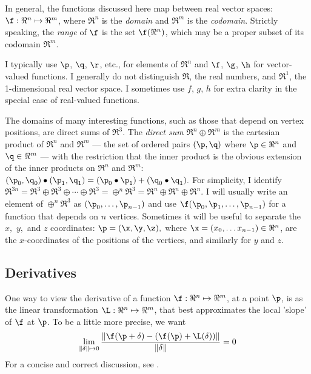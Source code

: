 In general, the functions discussed here map between real vector spaces:
$\f:{\Re}^{n} \mapsto \Re^{m}$, where $\Re^n$ is the
{\it domain} and $\Re^m$ is the {\it codomain}.
Strictly speaking, the {\it range} of $\f$ is the set $\f(\Re^n)$,
which may be a proper subset of its codomain $\Re^m$.

I typically use $\p$, $\q$, $\r$, etc., for elements of $\Re^n$
and
$\f$, $\g$, $\h$ for vector-valued functions.
I generally do not distinguish $\Re$, the real numbers,
and $\Re^1$, the 1-dimensional real vector space.
I sometimes use $f$, $g$, $h$ for extra clarity in the special
case of real-valued functions.

The domains of many interesting functions,
such as those that depend on vertex positions,
are direct sums of $\Re^3$.
The {\it direct sum} $\Re^n \oplus \Re^m$ is the cartesian product
of $\Re^n$ and $\Re^m$ --- the set of ordered pairs $(\p,\q)$
where $\p \in \Re^n$ and $\q \in \Re^m$ ---
with the restriction that the inner product is the obvious extension of the
inner products on $\Re^n$ and $\Re^m$:
$(\p_0,\q_0) \bullet (\p_1,\q_1) = (\p_0 \bullet \p_1) + (\q_0 \bullet \q_1).$
For simplicity, I identify
$\Re^{3n} = \Re^3 \oplus \Re^3 \oplus \cdots \oplus \Re^3 = \oplus^n \Re^3
= \Re^n \oplus \Re^n \oplus \Re^n $.
I will usually write an element of $\oplus^n \Re^3$ as
$(\p_0,\ldots,\p_{n-1})$
and use
$\f(\p_0,\p_1,\ldots,\p_{n-1})$
for a function that depends on $n$ vertices.
Sometimes it will be useful to separate the $x,$ $y,$ and $z$ coordinates:
$\p = (\x,\y,\z),$
where $\x =(x_0, \ldots x_{n-1}) \in \Re^n$, are the $x$-coordinates
of the positions of the vertices, and similarly for $y$ and $z$.


\subsection{Derivatives}
\label{sec:derivatives}

One way to view the derivative of a function
$\f:{\Re}^{n} \mapsto \Re^{m}$,
at a point $\p$,
is as the linear transformation $\L:{\Re}^{n} \mapsto \Re^{m}$,
that best approximates the local 'slope' of $\f$ at $\p$.
To be a little more precise, we want
\begin{displaymath}
\lim_{ \|{\bf \delta}  \| \mapsto 0}
{ \|{\f(\p + {\bf \delta}) - (\f(\p) + \L({\bf\delta})) \|}
  \over  \|{\bf \delta}  \|}
 = 0
\end{displaymath}
For a concise and correct discussion, see \cite{Spivak:1965:CalculusOnManifolds}.

